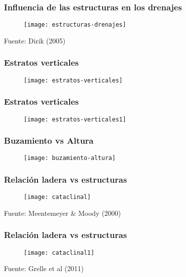 \documentclass[14pt]{beamer}
\begin{document}
  \begin{frame}
\frametitle{Influencia de las estructuras en los drenajes}
 \begin{figure}
    \centering
    \texttt{[image: estructuras-drenajes]}
  \end{figure}
  \tiny{Fuente: Dirik (2005)}
\end{frame}
  \begin{frame}
\frametitle{Estratos verticales}
 \begin{figure}
    \centering
    \texttt{[image: estratos-verticales]}
  \end{figure}
\end{frame}
  \begin{frame}
\frametitle{Estratos verticales}
 \begin{figure}
    \centering
    \texttt{[image: estratos-verticales1]}
  \end{figure}
\end{frame}
  \begin{frame}
\frametitle{Buzamiento vs Altura}
 \begin{figure}
    \centering
    \texttt{[image: buzamiento-altura]}
  \end{figure}
\end{frame}
  \begin{frame}
\frametitle{Relación ladera vs estructuras}
 \begin{figure}
    \centering
    \texttt{[image: cataclinal]}
  \end{figure}
  \tiny{Fuente: Meentemeyer \& Moody (2000) }
\end{frame}
  \begin{frame}
\frametitle{Relación ladera vs estructuras}
 \begin{figure}
    \centering
    \texttt{[image: cataclinal1]}
  \end{figure}
  \tiny{Fuente: Grelle et al (2011)}
\end{frame}
\end{document}
